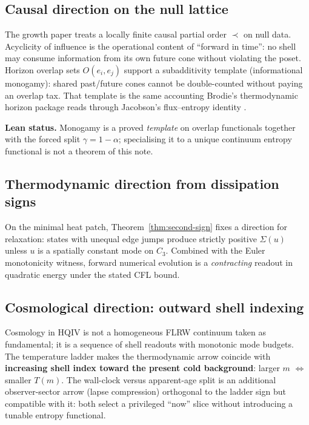 \documentclass[11pt]{amsart}
\begin{document}
\subsection{Causal direction on the null lattice}

The growth paper \cite{hqiv-3d-growth-paper} treats a locally finite causal partial order
$\prec$ on null data.
Acyclicity of influence is the operational content of ``forward in time'': no shell may
consume information from its own future cone without violating the poset.
Horizon overlap sets $O(e_i,e_j)$ support a subadditivity template (informational monogamy):
shared past/future cones cannot be double-counted without paying an overlap tax.
That template is the same accounting Brodie's thermodynamic horizon package
\cite{brodie2026} reads through Jacobson's flux--entropy identity \cite{Jacobson1995}.

\textbf{Lean status.} Monogamy is a proved \emph{template} on overlap functionals together
with the forced split $\gamma=1-\alpha$; specialising it to a unique continuum entropy
functional is not a theorem of this note.

\subsection{Thermodynamic direction from dissipation signs}

On the minimal heat patch, Theorem~\ref{thm:second-sign} fixes a direction for relaxation:
states with unequal edge jumps produce strictly positive $\Sigma(u)$ unless $u$ is a
spatially constant mode on $C_3$.
Combined with the Euler monotonicity witness, forward numerical evolution is a
\emph{contracting} readout in quadratic energy under the stated CFL bound.

\subsection{Cosmological direction: outward shell indexing}

Cosmology in HQIV is not a homogeneous FLRW continuum taken as fundamental; it is a
sequence of shell readouts with monotonic mode budgets.
The temperature ladder makes the thermodynamic arrow coincide with \textbf{increasing
shell index toward the present cold background}: larger $m$ $\Leftrightarrow$ smaller
$T(m)$.
The wall-clock versus apparent-age split \cite{hqiv-kirchhoff-paper,hqiv-oct-action-paper}
is an additional observer-sector arrow (lapse compression) orthogonal to the ladder sign
but compatible with it: both select a privileged ``now'' slice without introducing a
tunable entropy functional.
\end{document}
